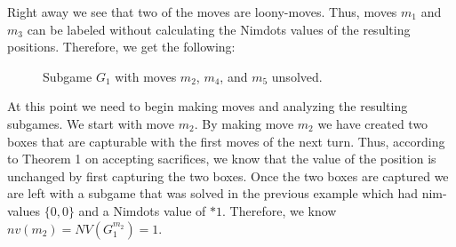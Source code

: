 \documentclass[12pt,twoside]{reedthesis}
\begin{document}
\noindent
Right away we see that two of the moves are loony-moves.  Thus, moves $m_1$ and $m_3$ can be labeled without calculating the Nimdots values of the resulting positions.  Therefore, we get the following: 

\begin{figure}[H]
\centering
{}
\caption{Subgame $G_1$ with moves $m_2$, $m_4$, and $m_5$ unsolved.}
\end{figure}

\noindent
At this point we need to begin making moves and analyzing the resulting subgames.  We start with move $m_2$.  By making move $m_2$ we have created two boxes that are capturable with the first moves of the next turn.  Thus, according to Theorem 1 on accepting sacrifices, we know that the value of the position is unchanged by first capturing the two boxes.  Once the two boxes are captured we are left with a subgame that was solved in the previous example which had nim-values $\{ 0 , 0 \}$ and a Nimdots value of $\ast 1$.  Therefore, we know $nv(m_2) = NV(G^{m_2}_1) = 1$.
\end{document}
